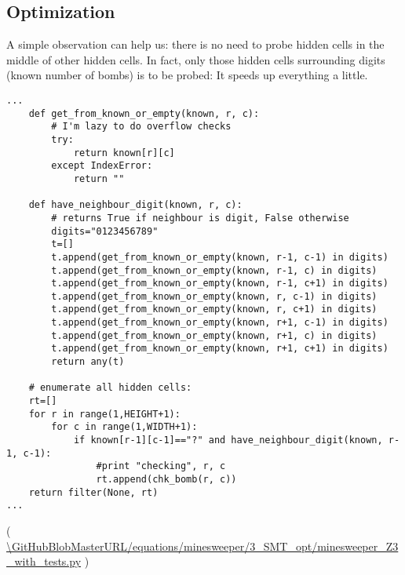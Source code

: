 \subsection{Optimization}

\renewcommand{\CURPATH}{equations/minesweeper/3_SMT_opt}

A simple observation can help us: there is no need to probe hidden cells in the middle of other hidden cells.
In fact, only those hidden cells surrounding digits (known number of bombs) is to be probed:
It speeds up everything a little.

\begin{lstlisting}[style=custompy]
...
    def get_from_known_or_empty(known, r, c):
        # I'm lazy to do overflow checks
        try:
            return known[r][c]
        except IndexError:
            return ""

    def have_neighbour_digit(known, r, c):
        # returns True if neighbour is digit, False otherwise
        digits="0123456789"
        t=[]
        t.append(get_from_known_or_empty(known, r-1, c-1) in digits)
        t.append(get_from_known_or_empty(known, r-1, c) in digits)
        t.append(get_from_known_or_empty(known, r-1, c+1) in digits)
        t.append(get_from_known_or_empty(known, r, c-1) in digits)
        t.append(get_from_known_or_empty(known, r, c+1) in digits)
        t.append(get_from_known_or_empty(known, r+1, c-1) in digits)
        t.append(get_from_known_or_empty(known, r+1, c) in digits)
        t.append(get_from_known_or_empty(known, r+1, c+1) in digits)
        return any(t)

    # enumerate all hidden cells:
    rt=[]
    for r in range(1,HEIGHT+1):
        for c in range(1,WIDTH+1):
            if known[r-1][c-1]=="?" and have_neighbour_digit(known, r-1, c-1):
                #print "checking", r, c
                rt.append(chk_bomb(r, c))
    return filter(None, rt)
...
\end{lstlisting}
( \url{\GitHubBlobMasterURL/\CURPATH/minesweeper_Z3_with_tests.py} )


